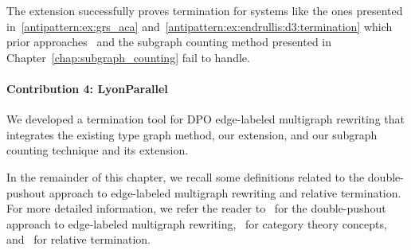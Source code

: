 The extension successfully proves termination for systems like the ones presented in~\autoref{antipattern:ex:grs_aca} and~\autoref{antipattern:ex:endrullis:d3:termination} which prior approaches~\cite{zantema2014termination,bruggink2014termination,bruggink2015proving,endrullis2024generalized_arxiv_v2,overbeek2024termination_lmcs} and the subgraph counting method presented in Chapter~\ref{chap:subgraph_counting} fail to handle. 

\paragraph{Contribution 4: LyonParallel}
We developed a termination tool for DPO edge-labeled multigraph rewriting that integrates the existing type graph method, our extension, and our subgraph counting technique and its extension.

In the remainder of this chapter, we recall some definitions related to the double-pushout approach to edge-labeled multigraph rewriting and relative termination. For more detailed information, we refer the reader to~\cite{konig2018atutorial,corradini1997algebraic} for the double-pushout approach to edge-labeled multigraph rewriting,~\cite{pierce1991basic,barr1990category} for category theory concepts, and~\cite{geser1990relative} for relative termination. 